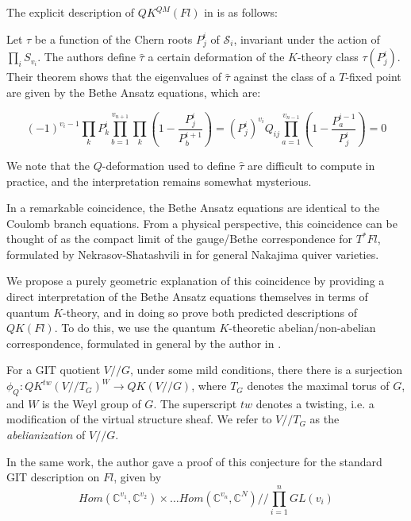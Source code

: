 \documentclass[11pt,letterpaper]{amsart}
\begin{document}
The explicit description of $QK^{QM}(Fl)$ in \cite{manybody} is as follows:

\begin{thm*}
    Let $\tau$ be a function of the Chern roots $P^i_j$ of $\mathcal{S}_i$, invariant under the action of $\prod_i S_{v_i}$. The authors define $\widehat{\tau}$ a certain deformation of the $K$-theory class $\tau(P^i_j)$. Their theorem shows that the eigenvalues of $\widehat{\tau}$ against the class of a $T$-fixed point are given by the Bethe Ansatz equations, which are:

    
\begin{equation}
(-1)^{v_i-1}\prod_k P^i_k\prod_{b=1}^{v_{n+1}}\prod_k(1-\frac{P^i_j}{P^{i+1}_b})=(P^i_j)^{v_i}Q_{ij}\prod_{a=1}^{v_{n-1}}(1-\frac{P^{i-1}_a}{P^{i}_j})=0
\end{equation}

We note that the $Q$-deformation used to define $\widehat{\tau}$ are difficult to compute in practice, and the interpretation remains somewhat mysterious. 
\end{thm*}

In a remarkable coincidence, the Bethe Ansatz equations are identical to the Coulomb branch equations. From a physical perspective, this coincidence can be thought of as the compact limit of the gauge/Bethe correspondence for $T^*Fl$, formulated by Nekrasov-Shatashvili in \cite{ns} for general Nakajima quiver varieties. 

We propose a purely geometric explanation of this coincidence by providing a direct interpretation of the Bethe Ansatz equations themselves in terms of quantum $K$-theory, and in doing so prove both predicted descriptions of $QK(Fl)$. To do this, we use the quantum $K$-theoretic abelian/non-abelian correspondence, formulated in general by the author in \cite{me}.
\begin{conj}
\label{abnonab}
For a GIT quotient $V//G$, under some mild conditions, there 
there is a surjection $\phi_Q: QK^{tw}(V//T_G)^W\to QK(V//G)$, where $T_G$ denotes the maximal torus of $G$, and $W$ is the Weyl group of $G$. The superscript $tw$ denotes a twisting, i.e. a modification of the virtual structure sheaf. We refer to $V//T_G$ as the \emph{abelianization} of $V//G$.
\end{conj}

In the same work, the author gave a proof of this conjecture for the standard GIT description on $Fl$, given by
$$Hom(\mathbb{C}^{v_1},\mathbb{C}^{v_{2}})\times\dots Hom(\mathbb{C}^{v_n},\mathbb{C}^N)//\prod_{i=1}^n GL(v_i)$$
\end{document}

